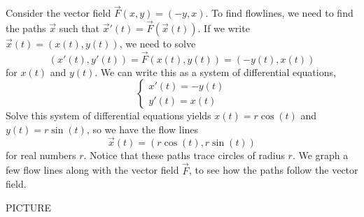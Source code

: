 \documentclass{ximera}
\begin{document}
\begin{example}
Consider the vector field $\vec{F}(x,y) = (-y,x)$. To find flowlines, we need to find the paths $\vec{x}$ such that $\vec{x}'(t) = \vec{F}(\vec{x}(t))$. If we write $\vec{x}(t) = (x(t), y(t))$, we need to solve
\[
(x'(t),y'(t)) = \vec{F}(x(t), y(t)) = (-y(t), x(t))
\]
for $x(t)$ and $y(t)$. We can write this as a system of differential equations,
\[
\begin{cases}
x'(t) = -y(t)\\
y'(t) = x(t)
\end{cases}
\]
Solve this system of differential equations yields $x(t) = r\cos(t)$ and $y(t) = r\sin(t)$, so we have the flow lines
\[
\vec{x}(t) = (r\cos(t), r\sin(t))
\]
for real numbers $r$. Notice that these paths trace circles of radius $r$. We graph a few flow lines along with the vector field $\vec{F}$, to see how the paths follow the vector field.

PICTURE
\end{example}
\end{document}
